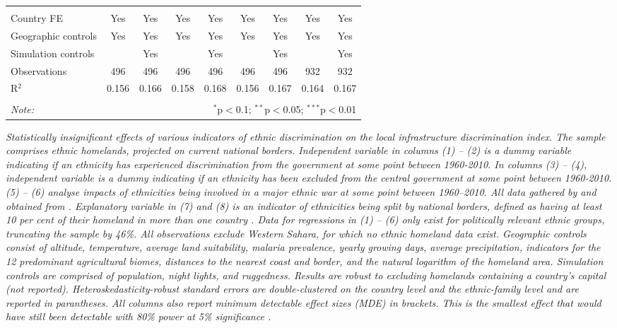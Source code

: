 \documentclass[11pt, oneside]{article}   	%
\newcommand{\mysubcaption}[1]{
\justify
\begin{spacing}{0.7}
\textit{\footnotesize #1}
\end{spacing}}
\begin{document}
\begin{table}[t]
{\begin{tabular}{@{\extracolsep{5pt}}lcccccccc}
    & & & & & & & & \\
  \hline \\[-1.8ex]
  Country FE & Yes & Yes & Yes & Yes & Yes & Yes & Yes & Yes \\
  Geographic controls & Yes & Yes & Yes & Yes & Yes & Yes & Yes & Yes \\
  Simulation controls &  & Yes &  & Yes &  & Yes &  & Yes \\
  Observations & 496 & 496 & 496 & 496 & 496 & 496 & 932 & 932 \\
  R$^{2}$ & 0.156 & 0.166 & 0.158 & 0.168 & 0.156 & 0.167 & 0.164 & 0.167 \\
  \hline
  \hline \\[-1.8ex]
  \textit{Note:}  & \multicolumn{8}{r}{$^{*}$p$<$0.1; $^{**}$p$<$0.05; $^{***}$p$<$0.01} \\
  \end{tabular}

}

\mysubcaption{Statistically insignificant effects of various indicators of ethnic discrimination on the local infrastructure discrimination index. The sample comprises ethnic homelands, projected on current national borders. Independent variable in columns (1) -- (2) is a dummy variable indicating if an ethnicity has experienced discrimination from the government at some point between 1960-2010. In columns (3) -- (4), independent variable is a dummy indicating if an ethnicity has been excluded from the central government at some point between 1960-2010. (5) -- (6) analyse impacts of ethnicities being involved in a major ethnic war at some point between 1960--2010. All data gathered by \cite{Vogt_IntegratingDataEthnicity_2015} and obtained from \cite{michalopoulos_long-run_2016}. Explanatory variable in (7) and (8) is an indicator of ethnicities being split by national borders, defined as having at least 10 per cent of their homeland in more than one country \citep[from][]{michalopoulos_long-run_2016}. Data for regressions in  (1) -- (6) only exist for politically relevant ethnic groups, truncating the sample by 46\%. All observations exclude Western Sahara, for which no ethnic homeland data exist. Geographic controls consist of altitude, temperature, average land suitability, malaria prevalence, yearly growing days, average precipitation, indicators for the 12 predominant agricultural biomes, distances to the nearest coast and border, and the natural logarithm of the homeland area.  Simulation controls are comprised of population, night lights, and ruggedness. Results are robust to excluding homelands containing a country's capital (not reported). Heteroskedasticity-robust standard errors are double-clustered on the country level and the ethnic-family level and are reported in parantheses. All columns also report minimum detectable effect sizes (MDE) in brackets. This is the smallest effect that would have still been detectable with 80\% power at 5\% significance \citep{Haushofer_ShorttermImpactUnconditional_2016}.}
\end{table}
\end{document}
